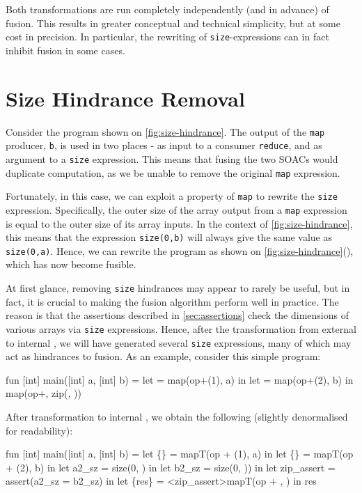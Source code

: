 Both transformations are run completely independently (and in advance)
of fusion.  This results in greater conceptual and technical
simplicity, but at some cost in precision.  In particular, the
rewriting of \texttt{size}-expressions can in fact inhibit fusion in
some cases.

\section{Size Hindrance Removal}
\label{sec:size-hindrance-removal}

Consider the program shown on \cref{fig:size-hindrance}.  The output
of the \texttt{map} producer, \texttt{b}, is used in two places - as
input to a consumer \texttt{reduce}, and as argument to a
\texttt{size} expression.  This means that fusing the two SOACs would
duplicate computation, as we be unable to remove the original
\texttt{map} expression.

Fortunately, in this case, we can exploit a property of \texttt{map}
to rewrite the \texttt{size} expression.  Specifically, the outer size
of the array output from a \texttt{map} expression is equal to the
outer size of its array inputs.  In the context of
\cref{fig:size-hindrance}, this means that the expression
\texttt{size(0,b)} will always give the same value as
\texttt{size(0,a)}.  Hence, we can rewrite the program as shown on
\cref{fig:size-hindrance}(), which
has now become fusible.

At first glance, removing \texttt{size} hindrances may appear to
rarely be useful, but in fact, it is crucial to making the fusion
algorithm perform well in practice.  The reason is that the assertions
described in \cref{sec:assertions} check the dimensions of various
arrays via \texttt{size} expressions.  Hence, after the transformation
from external to internal \LO{}, we will have generated several
\texttt{size} expressions, many of which may act as hindrances to
fusion.  As an example, consider this simple program:

\begin{colorcode}
fun [int] main([int] a, [int] b) =
  let  = map(op+(1), a) in
  let  = map(op+(2), b) in
  map(op+, zip(, ))
\end{colorcode}

After transformation to internal \LO{}, we obtain the following
(slightly denormalised for readability):

\begin{colorcode}
fun [int] main([int] a, [int] b) =
  let \{\} = mapT(op + (1), a) in
  let \{\} = mapT(op + (2), b) in
  let a2_sz = size(0, ) in
  let b2_sz = size(0, )) in
  let zip_assert = assert(a2_sz = b2_sz) in
  let \{res\} = <zip_assert>mapT(op + , ) in
  res
\end{colorcode}

